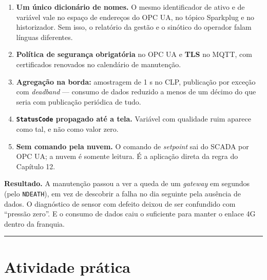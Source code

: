 \begin{enumerate}
\def\labelenumi{\arabic{enumi}.}
\tightlist
\item
  \textbf{Um único dicionário de nomes.} O mesmo identificador de ativo e de variável vale no espaço de endereços do OPC UA, no tópico Sparkplug e no historizador. Sem isso, o relatório da gestão e o sinótico do operador falam línguas diferentes.
\item
  \textbf{Política de segurança obrigatória} no OPC UA e \textbf{TLS} no MQTT, com certificados renovados no calendário de manutenção.
\item
  \textbf{Agregação na borda:} amostragem de 1 s no CLP, publicação por exceção com \emph{deadband} --- consumo de dados reduzido a menos de um décimo do que seria com publicação periódica de tudo.
\item
  \textbf{\passthrough{\lstinline!StatusCode!} propagado até a tela.} Variável com qualidade ruim aparece como tal, e não como valor zero.
\item
  \textbf{Sem comando pela nuvem.} O comando de \emph{setpoint} sai do SCADA por OPC UA; a nuvem é somente leitura. É a aplicação direta da regra do Capítulo 12.
\end{enumerate}

\textbf{Resultado.} A manutenção passou a ver a queda de um \emph{gateway} em segundos (pelo \passthrough{\lstinline!NDEATH!}), em vez de descobrir a falha no dia seguinte pela ausência de dados. O diagnóstico de sensor com defeito deixou de ser confundido com ``pressão zero''. E o consumo de dados caiu o suficiente para manter o enlace 4G dentro da franquia.

\begin{center}\rule{0.5\linewidth}{0.5pt}\end{center}

\section{Atividade prática}\label{atividade-pruxe1tica}

